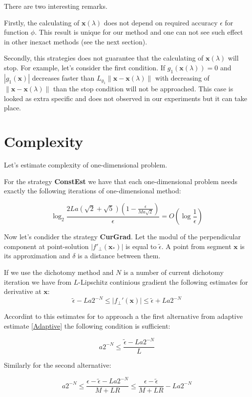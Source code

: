 \documentclass[12pt]{article}
\begin{document}
There are two interesting remarks.

Firstly, the calculating of $\textbf{x}(\lambda)$ does not depend on required accuracy $\epsilon$ for function $\phi$. This result is unique for our method and one can not see such effect in other inexact methods (see the next section).

Secondly, this strategies does not guarantee that the calculating of $\textbf{x}(\lambda)$ will stop. For example, let's consider the first condition. If $g_1(\textbf{x}(\lambda)) = 0$  and $|g_1(\textbf{x})|$ decreases faster than $L_{g_1}\|\textbf{x}-\textbf{x}(\lambda)\|$ with decreasing of $\|\textbf{x}-\textbf{x}(\lambda)\|$ than the stop condition will not be approached. This case is looked as extra specific and does not observed in our experiments but it can take place.



\section{Complexity}

Let's estimate complexity of one-dimensional problem.

For the strategy \textbf{ConstEst} we have that each one-dimensional problem needs exactly the following iterations of one-dimensional method:

$$\log_2\frac{2La(\sqrt{2}+\sqrt{5})(1-\frac{\epsilon}{Ma\sqrt{2}})}{\epsilon} = O\left(\log \frac{1}{\epsilon}\right)$$

Now let's condider the strategy \textbf{CurGrad}. Let the modul of the perpendicular component at point-solution $|f'_\perp(\textbf{x}_*)|$ is equal to $\tilde{\epsilon}$. A point from segment $\textbf{x}$ is its approximation and $\delta$ is a distance between them.

If we use the dichotomy method and $N$ is a number of current dichotomy iteration we have from $L$-Lipschitz continious gradient the following estimates for derivative at $\textbf{x}$:
$$\tilde{\epsilon}-La2^{-N} \leq |f_\perp'(\textbf{x})|\leq \tilde{\epsilon}+La2^{-N}$$

Accordint to this estimates for to approach a the first alternative from adaptive estimate \ref{Adaptive} the following condition is sufficient:

$$a2^{-N} \leq \frac{\tilde{\epsilon}-La2^{-N}}{L}$$

Similarly for the second alternative:

$$a2^{-N} \leq \frac{\epsilon - \tilde{\epsilon} - La2^{-N}}{M+LR}\leq \frac{\epsilon - \tilde{\epsilon}}{M+LR} - La2^{-N}$$
\end{document}
